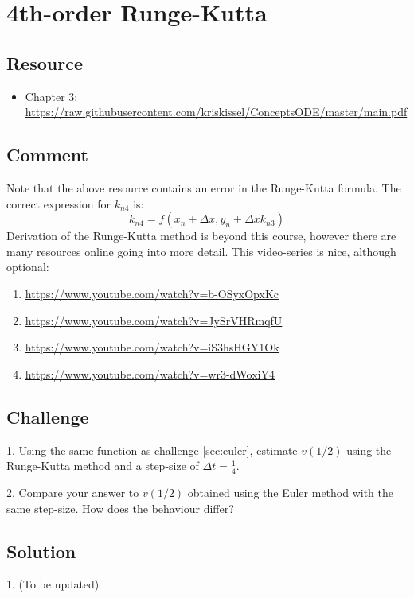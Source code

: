 \newpage
\section{4th-order Runge-Kutta}

\subsection*{Resource}
\begin{itemize}
    \item Chapter 3: \url{https://raw.githubusercontent.com/kriskissel/ConceptsODE/master/main.pdf}
\end{itemize}

\subsection*{Comment}
Note that the above resource contains an error in the Runge-Kutta formula. The correct expression for $k_{n4}$ is:
\begin{equation}
    k_{n4} = f \left( x_n + \Delta x, y_n + \Delta x k_{n3} \right)
\end{equation}
Derivation of the Runge-Kutta method is beyond this course, however there are many resources online going into more detail. This video-series is nice, although optional:
\begin{enumerate}
    \item \url{https://www.youtube.com/watch?v=b-OSyxOpxKc}
    \item \url{https://www.youtube.com/watch?v=JySrVHRmqfU}
    \item \url{https://www.youtube.com/watch?v=iS3hsHGY1Ok}
    \item \url{https://www.youtube.com/watch?v=wr3-dWoxiY4}
\end{enumerate}

\subsection*{Challenge}
1. Using the same function as challenge \ref{sec:euler}, estimate $v(1/2)$ using the Runge-Kutta method and a step-size of $\Delta t = \frac{1}{4}$.

2. Compare your answer to $v(1/2)$ obtained using the Euler method with the same step-size. How does the behaviour differ?

\subsection*{Solution}
1. (To be updated) %

